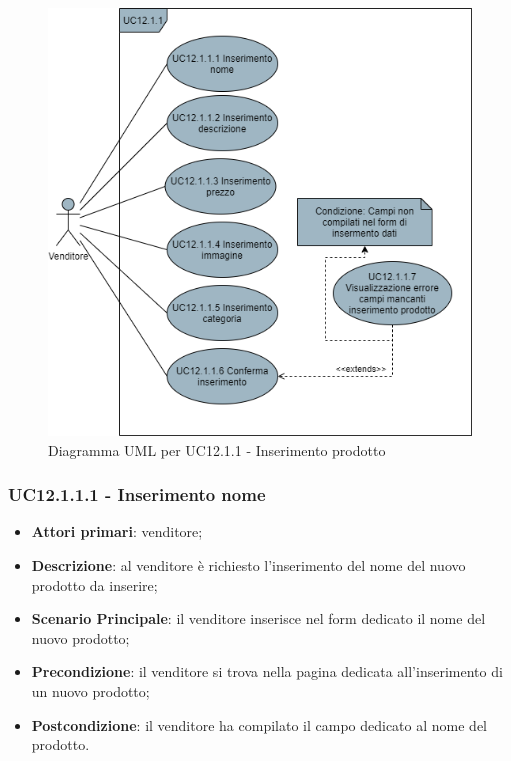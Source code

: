 \begin{figure}[H]
\centering
\includegraphics[scale=0.6]{res/UseCase/Immagini/InserimentoProdotto}
\caption{Diagramma UML per UC12.1.1 - Inserimento prodotto}
\end{figure}

\subsubsection{UC12.1.1.1 - Inserimento nome}
\begin{itemize}
\item \textbf{Attori primari}: venditore;
\item \textbf{Descrizione}: al venditore è richiesto l'inserimento del nome del nuovo prodotto da inserire;
\item \textbf{Scenario Principale}: il venditore inserisce nel form dedicato il nome del nuovo prodotto;
\item \textbf{Precondizione}: il venditore si trova nella pagina dedicata all'inserimento di un nuovo prodotto;
\item \textbf{Postcondizione}: il venditore ha compilato il campo dedicato al nome del prodotto.
\end{itemize}

